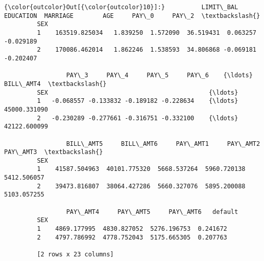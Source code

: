 \documentclass[11pt]{article}
\begin{document}
\begin{Verbatim}[commandchars=\\\{\}]
{\color{outcolor}Out[{\color{outcolor}10}]:}          LIMIT\_BAL  EDUCATION  MARRIAGE        AGE     PAY\_0     PAY\_2  \textbackslash{}
         SEX                                                                      
         1    163519.825034   1.839250  1.572090  36.519431  0.063257 -0.029189   
         2    170086.462014   1.862246  1.538593  34.806868 -0.069181 -0.202407   
         
                 PAY\_3     PAY\_4     PAY\_5     PAY\_6    {\ldots}        BILL\_AMT4  \textbackslash{}
         SEX                                            {\ldots}                    
         1   -0.068557 -0.133832 -0.189182 -0.228634    {\ldots}     45000.331090   
         2   -0.230289 -0.277661 -0.316751 -0.332100    {\ldots}     42122.600099   
         
                 BILL\_AMT5     BILL\_AMT6     PAY\_AMT1     PAY\_AMT2     PAY\_AMT3  \textbackslash{}
         SEX                                                                      
         1    41587.504963  40101.775320  5668.537264  5960.720138  5412.506057   
         2    39473.816807  38064.427286  5660.327076  5895.200088  5103.057255   
         
                 PAY\_AMT4     PAY\_AMT5     PAY\_AMT6   default  
         SEX                                                   
         1    4869.177995  4830.827052  5276.196753  0.241672  
         2    4797.786992  4778.752043  5175.665305  0.207763  
         
         [2 rows x 23 columns]
\end{Verbatim}
            
\end{document}
